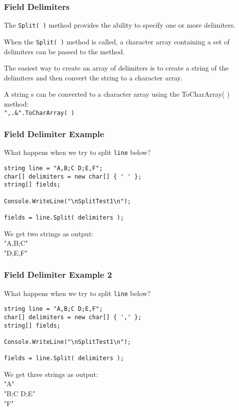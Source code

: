 \begin{frame}
\frametitle{Field Delimiters}

The \texttt{Split( )} method provides the ability to specify one or more delimiters.

When the \texttt{Split( )} method is called, a character array containing a set of delimiters can be passed to the method.

The easiest way to create an array of delimiters is to create a string of the delimiters and then convert the string to a character array.

A string s can be converted to a character array using the ToCharArray( ) method:\\
\quad \texttt{",.\&".ToCharArray( )}

\end{frame}

\begin{frame}[fragile]
\frametitle{Field Delimiter Example}

What happens when we try to split \texttt{line} below?

\begin{verbatim}
string line = "A,B;C D;E,F";
char[] delimiters = new char[] { ' ' };
string[] fields;

Console.WriteLine("\nSplitTest1\n");

fields = line.Split( delimiters );
\end{verbatim}

We get two strings as output:\\
\quad "A,B;C"\\
\quad "D;E,F"

\end{frame}

\begin{frame}[fragile]
\frametitle{Field Delimiter Example 2}

What happens when we try to split \texttt{line} below?

\begin{verbatim}
string line = "A,B;C D;E,F";
char[] delimiters = new char[] { ',' };
string[] fields;

Console.WriteLine("\nSplitTest1\n");

fields = line.Split( delimiters );
\end{verbatim}

We get three strings as output:\\
\quad "A"\\
\quad "B;C D;E"\\
\quad "F"

\end{frame}

